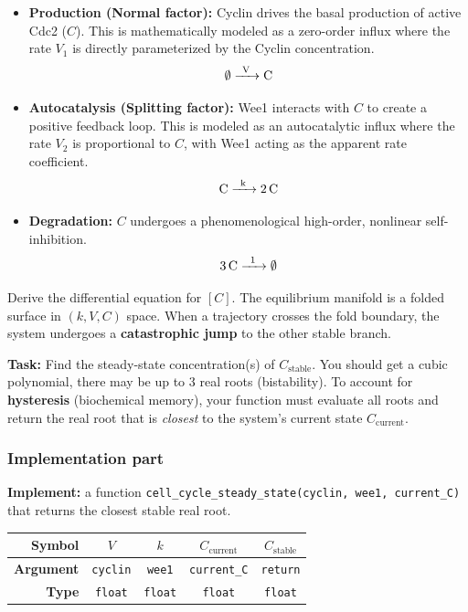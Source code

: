 \documentclass[11pt]{article}
\begin{document}
\begin{itemize}
    \item \textbf{Production (Normal factor):} Cyclin drives the basal production of active Cdc2 ($C$). This is mathematically modeled as a zero-order influx where the rate $V_1$ is directly parameterized by the Cyclin concentration.
    $$ \emptyset\ce{->[V] C} $$

    \item \textbf{Autocatalysis (Splitting factor):} Wee1 interacts with $C$ to create a positive feedback loop. This is modeled as an autocatalytic influx where the rate $V_2$ is proportional to $C$, with Wee1 acting as the apparent rate coefficient.
    $$ \ce{C ->[k] 2C}$$

    \item \textbf{Degradation:} $C$ undergoes a phenomenological high-order, nonlinear self-inhibition.
    $$ \ce{3C ->[1] \emptyset}$$
\end{itemize}

Derive the differential equation for $[C]$.
The equilibrium manifold is a folded surface in $(k, V, C)$ space.
When a trajectory crosses the fold boundary, the system undergoes a \textbf{catastrophic jump} to the other stable branch.


\textbf{Task:} Find the steady-state concentration(s) of $C_\text{stable}$.
You should get a cubic polynomial, there may be up to 3 real roots (bistability). 
To account for \textbf{hysteresis} (biochemical memory), your function must evaluate all roots and return the real root that is \emph{closest} to the system's current state $C_\text{current}$.

\subsubsection*{Implementation part}
\textbf{Implement:} a function \lstinline|cell_cycle_steady_state(cyclin, wee1, current_C)| that returns the closest stable real root.

\begin{center}
\renewcommand{\arraystretch}{2.0}
\begin{tabular}{r | c | c | c | c}
\toprule
\textbf{Symbol} & $V$ & $k$ & $C_\text{current}$ & $C_\text{stable}$ \\ \midrule
\textbf{Argument} & \lstinline|cyclin| & \lstinline|wee1| & \lstinline|current_C| & \lstinline|return| \\ \midrule
\textbf{Type} & \lstinline|float| & \lstinline|float| & \lstinline|float| & \lstinline|float| \\
\bottomrule
\end{tabular}
\end{center}
\end{document}

